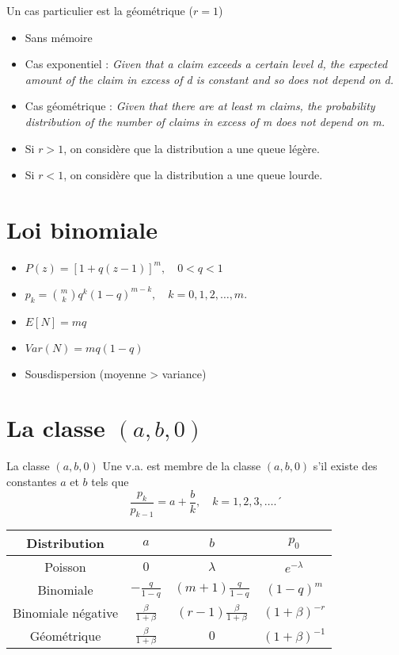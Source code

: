 Un cas particulier est la géométrique ($r = 1$)
\begin{itemize}
	\item Sans mémoire
	\item Cas exponentiel : \textit{Given that a claim exceeds a certain level d, the expected amount of the claim in excess of d is constant and so does not depend on d.}
	\item Cas géométrique : \textit{Given that there are at least m claims, the probability distribution of the number of claims in excess of m does not depend on m.}
	\item Si $r>1$, on considère que la distribution a une queue légère.
	\item Si $r<1$, on considère que la distribution a une queue lourde.
\end{itemize}

\section{Loi binomiale}

\begin{itemize}
	\item $\displaystyle P(z) = \left[1 + q(z-1)\right]^m, \quad 0<q<1$
	\item $\displaystyle p_k = \binom{m}{k}q^k(1-q)^{m-k}, \quad k = 0, 1, 2, \dots, m.$
	\item $E[N] = mq$
	\item $Var(N) = mq(1-q)$
	\item Sousdispersion (moyenne > variance)
\end{itemize}

\section{La classe $(a, b, 0)$}

\begin{definition}{La classe $(a, b, 0)$}{}
	Une v.a. est membre de la classe $(a, b, 0)$ s'il existe des constantes $a$ et $b$ tels que
	$$\frac{p_k}{p_{k-1}} = a + \frac{b}{k}, \quad k = 1, 2, 3, \dots.´$$
\end{definition}

\begin{center}
	\begin{tabular}{cccc}
		\hline
		   Distribution    &            $a$            &              $b$               &       $p_0$        \\ \hline
		     Poisson       &            $0$            &           $\lambda$            &   $e^{-\lambda}$   \\
		    Binomiale      &     $-\frac{q}{1-q}$      &     $(m + 1)\frac{q}{1-q}$     &     $(1-q)^m$      \\
		Binomiale négative & $\frac{\beta}{1 + \beta}$ & $(r-1)\frac{\beta}{1 + \beta}$ &  $(1+\beta)^{-r}$  \\
		   Géométrique     & $\frac{\beta}{1 + \beta}$ &              $0$               & $(1 + \beta)^{-1}$ \\ \hline
	\end{tabular}
\end{center}

